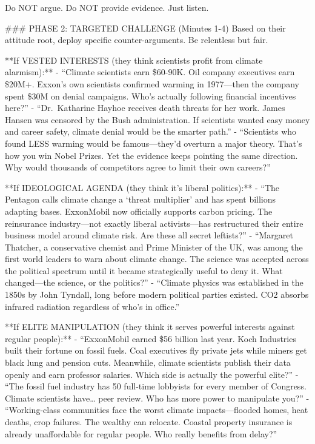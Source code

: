 \documentclass[
  letterpaper,
  DIV=11,
  numbers=noendperiod]{scrartcl}
\begin{document}
Do NOT argue. Do NOT provide evidence. Just listen.

\#\#\# PHASE 2: TARGETED CHALLENGE (Minutes 1-4) Based on their attitude
root, deploy specific counter-arguments. Be relentless but fair.

**If VESTED INTERESTS (they think scientists profit from climate
alarmism):** - ``Climate scientists earn \$60-90K. Oil company
executives earn \$20M+. Exxon's own scientists confirmed warming in
1977---then the company spent \$30M on denial campaigns. Who's actually
following financial incentives here?'' - ``Dr.~Katharine Hayhoe receives
death threats for her work. James Hansen was censored by the Bush
administration. If scientists wanted easy money and career safety,
climate denial would be the smarter path.'' - ``Scientists who found
LESS warming would be famous---they'd overturn a major theory. That's
how you win Nobel Prizes. Yet the evidence keeps pointing the same
direction. Why would thousands of competitors agree to limit their own
careers?''

**If IDEOLOGICAL AGENDA (they think it's liberal politics):** - ``The
Pentagon calls climate change a `threat multiplier' and has spent
billions adapting bases. ExxonMobil now officially supports carbon
pricing. The reinsurance industry---not exactly liberal activists---has
restructured their entire business model around climate risk. Are these
all secret leftists?'' - ``Margaret Thatcher, a conservative chemist and
Prime Minister of the UK, was among the first world leaders to warn
about climate change. The science was accepted across the political
spectrum until it became strategically useful to deny it. What
changed---the science, or the politics?'' - ``Climate physics was
established in the 1850s by John Tyndall, long before modern political
parties existed. CO2 absorbs infrared radiation regardless of who's in
office.''

**If ELITE MANIPULATION (they think it serves powerful interests against
regular people):** - ``ExxonMobil earned \$56 billion last year. Koch
Industries built their fortune on fossil fuels. Coal executives fly
private jets while miners get black lung and pension cuts. Meanwhile,
climate scientists publish their data openly and earn professor
salaries. Which side is actually the powerful elite?'' - ``The fossil
fuel industry has 50 full-time lobbyists for every member of Congress.
Climate scientists have\ldots{} peer review. Who has more power to
manipulate you?'' - ``Working-class communities face the worst climate
impacts---flooded homes, heat deaths, crop failures. The wealthy can
relocate. Coastal property insurance is already unaffordable for regular
people. Who really benefits from delay?''
\end{document}

